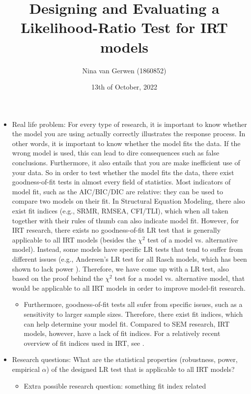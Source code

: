 \documentclass{article}
\title{Designing and Evaluating a Likelihood-Ratio Test for IRT models}
\author{Nina van Gerwen (1860852)}
\date{13th of October, 2022}
\begin{document}
\maketitle

\newpage
\begin{itemize}
\item Real life problem: For every type of research, it is important to know whether the model you are using actually correctly illustrates the response process. In other words, it is important to know whether the model fits the data. If the wrong model is used, this can lead to dire consequences such as false conclusions. Furthermore, it also entails that you are make inefficient use of your data. So in order to test whether the model fits the data, there exist goodness-of-fit tests in almost every field of statistics. Most indicators of model fit, such as the AIC/BIC/DIC are relative: they can be used to compare two models on their fit. In Structural Equation Modeling, there also exist fit indices (e.g., SRMR, RMSEA, CFI/TLI), which when all taken together with their rules of thumb can also indicate model fit. However, for IRT research, there exists no goodness-of-fit LR test that is generally applicable to all IRT models (besides the $\chi^2$ test of a model vs. alternative model). Instead, some models have specific LR tests that tend to suffer from different issues (e.g., Andersen's LR test for all Rasch models, which has been shown to lack power \autocite{ref2}). Therefore, we have come up with a LR test, also based on the proof behind the $\chi^2$ test for a model vs. alternative model, that would be applicable to all IRT models in order to improve model-fit research. 
	\begin{itemize}
		\item Furthermore, goodness-of-fit tests all sufer from specific issues, such as a sensitivity to larger sample sizes. Therefore, there exist fit indices, which can help determine your model fit. Compared to SEM research, IRT models, however, have a lack of fit indices. For a relatively recent overview of fit indices used in IRT, see \textcite{ref1}.
	\end{itemize}
\item Research questions: What are the statistical properties (robustness, power, empirical $\alpha$) of the designed LR test that is applicable to all IRT models?
	\begin{itemize} 
		\item Extra possible research question: something fit index related
	\end{itemize}

\end{itemize}
\end{document}

